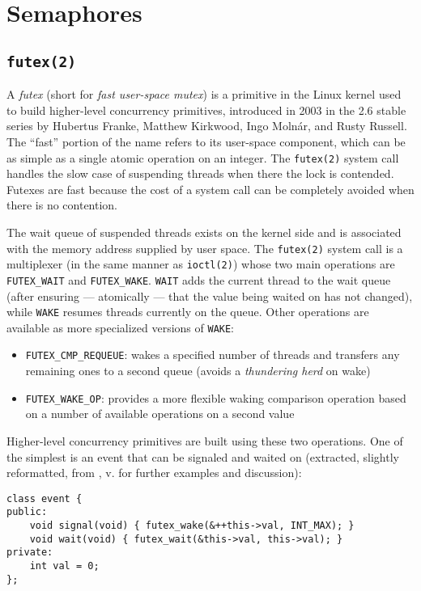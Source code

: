 \section{Semaphores}

\subsection{\texttt{futex(2)}}

A \textit{futex} (short for \textit{fast user-space mutex}) is a primitive in
the Linux kernel used to build higher-level concurrency primitives, introduced
in 2003 in the 2.6 stable series by Hubertus Franke, Matthew Kirkwood, Ingo
Molnár, and Rusty Russell.  The ``fast'' portion of the name refers to its
user-space component, which can be as simple as a single atomic operation on an
integer.  The \texttt{futex(2)} system call handles the slow case of suspending
threads when there the lock is contended.  Futexes are fast because the cost of
a system call can be completely avoided when there is no
contention.\footnotemark


The wait queue of suspended threads exists on the kernel side and is associated
with the memory address supplied by user space.  The \texttt{futex(2)} system
call is a multiplexer (in the same manner as \texttt{ioctl(2)}) whose two main
operations are \texttt{FUTEX\_WAIT} and \texttt{FUTEX\_WAKE}.  \texttt{WAIT}
adds the current thread to the wait queue (after ensuring --- atomically ---
that the value being waited on has not changed), while \texttt{WAKE} resumes
threads currently on the queue.  Other operations are available as more
specialized versions of \texttt{WAKE}:

\begin{itemize}
    \item \texttt{FUTEX\_CMP\_REQUEUE}:
        wakes a specified number of threads and transfers any remaining ones to
        a second queue (avoids a \textit{thundering herd} on wake)
    \item \texttt{FUTEX\_WAKE\_OP}:
        provides a more flexible waking comparison operation based on a number
        of available operations on a second value
\end{itemize}

Higher-level concurrency primitives are built using these two operations.  One
of the simplest is an event that can be signaled and waited on (extracted,
slightly reformatted, from \cite{Drepper2011}, v. for further examples and
discussion):

\begin{lstlisting}[style=c++]
class event {
public:
    void signal(void) { futex_wake(&++this->val, INT_MAX); }
    void wait(void) { futex_wait(&this->val, this->val); }
private:
    int val = 0;
};
\end{lstlisting}
